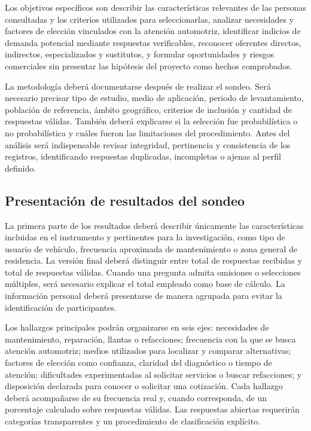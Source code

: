 {Los objetivos específicos son describir las características relevantes de las personas consultadas y los criterios utilizados para seleccionarlas, analizar necesidades y factores de elección vinculados con la atención automotriz, identificar indicios de demanda potencial mediante respuestas verificables, reconocer oferentes directos, indirectos, especializados y sustitutos, y formular oportunidades y riesgos comerciales sin presentar las hipótesis del proyecto como hechos comprobados.

La metodología deberá documentarse después de realizar el sondeo. Será necesario precisar tipo de estudio, medio de aplicación, periodo de levantamiento, población de referencia, ámbito geográfico, criterios de inclusión y cantidad de respuestas válidas. También deberá explicarse si la selección fue probabilística o no probabilística y cuáles fueron las limitaciones del procedimiento. Antes del análisis será indispensable revisar integridad, pertinencia y consistencia de los registros, identificando respuestas duplicadas, incompletas o ajenas al perfil definido.

\subsection{Presentación de resultados del sondeo}

La primera parte de los resultados deberá describir únicamente las características incluidas en el instrumento y pertinentes para la investigación, como tipo de usuario de vehículo, frecuencia aproximada de mantenimiento o zona general de residencia. La versión final deberá distinguir entre total de respuestas recibidas y total de respuestas válidas. Cuando una pregunta admita omisiones o selecciones múltiples, será necesario explicar el total empleado como base de cálculo. La información personal deberá presentarse de manera agrupada para evitar la identificación de participantes.

Los hallazgos principales podrán organizarse en seis ejes: necesidades de mantenimiento, reparación, llantas o refacciones; frecuencia con la que se busca atención automotriz; medios utilizados para localizar y comparar alternativas; factores de elección como confianza, claridad del diagnóstico o tiempo de atención; dificultades experimentadas al solicitar servicios o buscar refacciones; y disposición declarada para conocer o solicitar una cotización. Cada hallazgo deberá acompañarse de su frecuencia real y, cuando corresponda, de un porcentaje calculado sobre respuestas válidas. Las respuestas abiertas requerirán categorías transparentes y un procedimiento de clasificación explícito.

}
